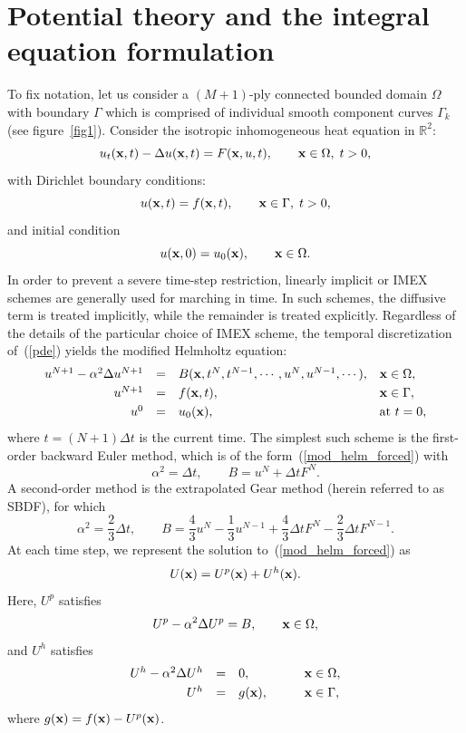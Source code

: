 \documentclass[preprint,12pt]{elsarticle}
\newcommand{\x}{{\bf x}}
\newcommand{\eqr}[1]{~(\ref{#1})}
\newcommand{\figr}[1]{figure~\ref{#1}}
\begin{document}
\section{Potential theory and the integral equation formulation}
To fix notation, let us consider a $(M+1)$-ply connected bounded domain $\Omega$ with boundary $\Gamma$ which is comprised of individual smooth component curves $\Gamma_k$ (see \figr{fig1}). Consider the isotropic inhomogeneous heat equation in $\mathbb{R}^2$:
\begin{equation}
  u_t(\x,t) -\Delta u(\x,t) = F(\x,u,t),  \qquad  \x \in \Omega, \; t>0,  \label{pde} 
\end{equation}
with Dirichlet boundary conditions:
\[
  u(\x,t) =  f(\x,t), \qquad  \x \in \Gamma, \; t>0, 
\]
and initial condition
\[
  u(\x,0) = u_0(\x), \qquad  {\x} \in \Omega.  
\]
In order to prevent a severe time-step restriction, linearly implicit or IMEX schemes \cite{Ruuth} are generally used for marching in time. 
In such schemes, the diffusive term is treated implicitly, while the remainder is treated explicitly.
Regardless of the details of the particular choice of IMEX scheme, the temporal discretization of\eqr{pde} yields the modified Helmholtz equation:
\begin{equation}
\begin{array}{rcll}
  u^{N+1} - \alpha^2 \Delta u^{N+1} & = &  B(\x, t^N, t^{N-1}, \cdots,  u^N,u^{N-1},\cdots), & {\x} \in \Omega,  \smallskip \\
  u^{N+1} & =  & f(\x,t), &  \x \in \Gamma, \smallskip \\
  u^0 & =  & u_0(\x), &  \mbox{at } t = 0,
 \end{array}
\label{mod_helm_forced} 
\end{equation}
where $t=(N+1) \Delta t$ is the current time.
The simplest such scheme is the first-order backward Euler method, which is of the form\eqr{mod_helm_forced} with   
\[
   \alpha^2 =  \Delta t, \qquad B = u^N + \Delta t F^N. 
\]
A second-order method is the extrapolated Gear method (herein referred to as SBDF), for which
\[
\alpha^2 =  \frac{2}{3} \Delta t, \qquad B = \frac{4}{3} u^N -\frac{1}{3} u^{N-1}+
                 \frac{4}{3}  \Delta t F^N  - \frac{2}{3} \Delta t F^{N-1}. \label{exg}
\]
At each time step, we represent the solution to\eqr{mod_helm_forced} as
\[
U(\x) = U^p(\x) + U^h(\x).  
\]
Here, $U^p$ satisfies
\begin{equation}
   U^p - \alpha^2 \Delta U^p = B, \qquad    \x \in \Omega, 
   \label{particular}
\end{equation}
and $U^h$ satisfies
\begin{equation}
   \begin{array}{rcll}
   U^h  - \alpha^2 \Delta U^h & = & 0, &   \qquad \x \in \Omega, \smallskip \\
   U^h & =  & g(\x) , &   \qquad \x \in \Gamma,  
   \end{array}
 \label{mod_helm_hom}
\end{equation}
where $g(\x) =  f(\x) - U^p(\x)$.
\end{document}
